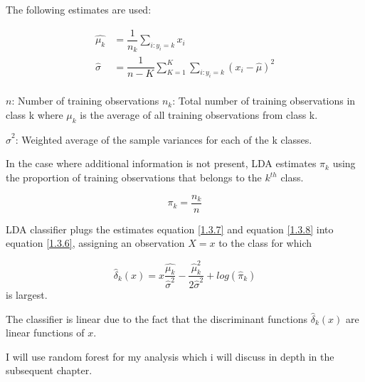 The following estimates are used:

\begin{align}
\hat{\mu_k}&=\dfrac{1}{n_{k}} \sum _{i:y_i=k} x_{i}\\ \label{1.3.7}
\hat{\sigma}&=\dfrac{1}{n-K} \sum _{K=1}^K \sum _{i:y_i=k}(x_{i}-\hat{\mu})^2\\ \label{1.3.8}
\end{align}

$n$: Number of training observations
$n_k$: Total number of training observations in class k where $\mu_k$ is the average of all training observations from class k.

$\hat{\sigma}^2$: Weighted average of the sample variances for each of the k classes.

In the case where additional information is not present, LDA estimates $\pi_{k}$ using the proportion of training observations that belongs to the $k^{th}$ class.

\begin{equation}
\pi_{k}=\dfrac{n_k}{n} \label{1.3.9}
\end{equation}

LDA classifier plugs the estimates equation \eqref{1.3.7} and equation \eqref{1.3.8} into equation \eqref{1.3.6}, assigning an observation $X=x$ to the class for which 

\begin{equation}
\hat{\delta}_{k}(x)=x \dfrac{\hat{\mu_{k}}}{\hat{\sigma}^2}-\dfrac{\hat{\mu}^2_{k}}{2 \hat{\sigma}^2}+log(\hat{\pi}_k)
\end{equation}
is largest.

The classifier is linear due to the fact that the discriminant functions $\hat{\delta}_{k}(x)$ are linear functions of $x$.

I will use random forest for my analysis which i will discuss in depth in the subsequent chapter.